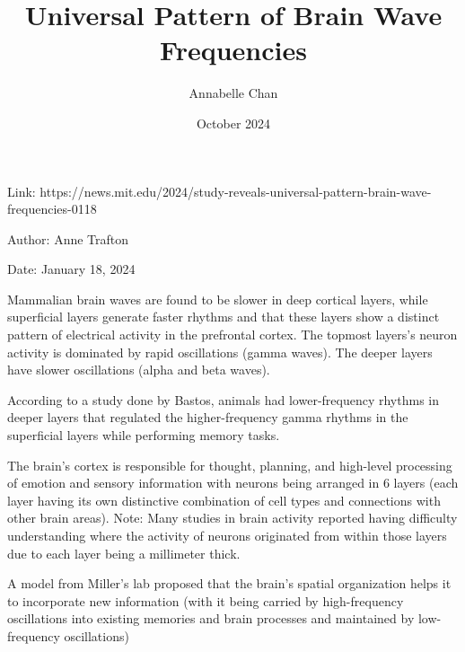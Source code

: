 \documentclass[12pt]{article}
\title{Universal Pattern of Brain Wave Frequencies}
\author{Annabelle Chan}
\date{October 2024}
\begin{document}
\maketitle
Link: https://news.mit.edu/2024/study-reveals-universal-pattern-brain-wave-frequencies-0118

Author: Anne Trafton

Date: January 18, 2024\newline

Mammalian brain waves are found to be slower in deep cortical layers, while superficial layers generate faster rhythms and that these layers show a distinct pattern of electrical activity in the prefrontal cortex.
The topmost layers’s neuron activity is dominated by rapid oscillations (gamma waves).
The deeper layers have slower oscillations (alpha and beta waves).


According to a study done by Bastos, animals had lower-frequency rhythms in deeper layers that regulated the higher-frequency gamma rhythms in the superficial layers while performing memory tasks.


The brain’s cortex is responsible for thought, planning, and high-level processing of emotion and sensory information with neurons being arranged in 6 layers (each layer having its own distinctive combination of cell types and connections with other brain areas).
Note: Many studies in brain activity reported having difficulty understanding where the activity of neurons originated from within those layers due to each layer being a millimeter thick.


A model from Miller’s lab proposed that the brain’s spatial organization helps it to incorporate new information (with it being carried by high-frequency oscillations into existing memories and brain processes and maintained by low-frequency oscillations)
\end{document}
